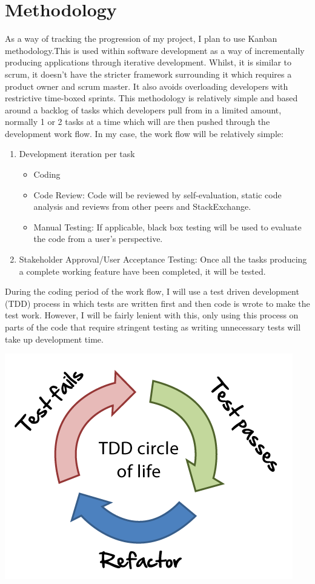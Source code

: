 \documentclass[]{report}
\begin{document}
	\section{Methodology}
		As a way of tracking the progression of my project, I plan to use Kanban methodology.This is used within software development as a way of incrementally producing applications through iterative development. Whilst, it is similar to scrum, it doesn't have the stricter framework surrounding it which requires a product owner and scrum master. It also avoids overloading developers with restrictive time-boxed sprints. This methodology is relatively simple and based around a backlog of tasks which developers pull from in a limited amount, normally 1 or 2 tasks at a time which will are then pushed through the development work flow. In my case, the work flow will be relatively simple:
			\begin{enumerate}
				\item Development iteration per task
				\begin{itemize}
					\item Coding
					\item Code Review: Code will be reviewed by self-evaluation, static code analysis and reviews from other peers and StackExchange.
					\item Manual Testing: If applicable, black box testing will be used to evaluate the code from a user's perspective.
				\end{itemize}
				\item Stakeholder Approval/User Acceptance Testing: Once all the tasks producing a complete working feature have been completed, it will be tested. 
			\end{enumerate}
		During the coding period of the work flow, I will use a test driven development (TDD) process in which tests are written first and then code is wrote to make the test work. However, I will be fairly lenient with this, only using this process on parts of the code that require stringent testing as writing unnecessary tests will take up development time. 
		\begin{center}
			\includegraphics[scale=0.5]{tdd-circle-of-life.png}
		\end{center}
\end{document}
